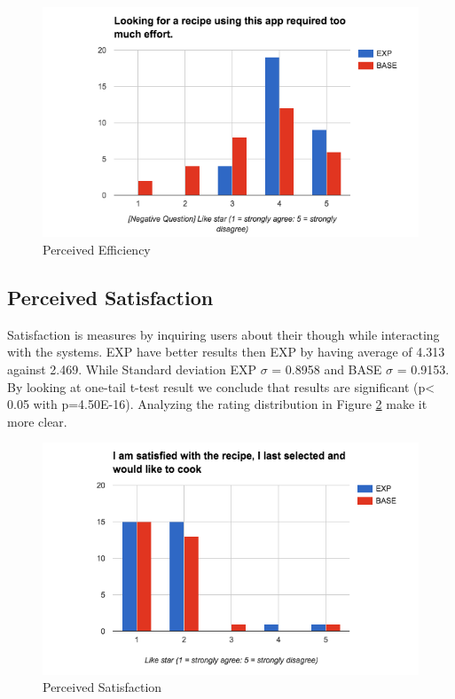 \begin{figure}[h]
	\centering
	\includegraphics[width= 1\linewidth]{figures/ch5_stat_effiiciency}
	\caption{Perceived Efficiency}
	\label{fig:ch5_stat_effiiciency}
\end{figure}

\newpage
\subsection{Perceived Satisfaction}

Satisfaction is measures by inquiring users about their though while interacting with the systems. EXP have better results then EXP by having average of 4.313 against 2.469. While  Standard deviation EXP ${\sigma}$ = 0.8958 and BASE ${\sigma}$ = 0.9153. By looking at one-tail t-test result we conclude that results are significant (p< 0.05 with p=4.50E-16). Analyzing the rating distribution in Figure \ref{fig:ch5_stat_satisfaction} make it more clear. 

\begin{figure}[h]
	\centering
	\includegraphics[width= 1\linewidth]{figures/ch5_stat_satisfaction}
	\caption{Perceived Satisfaction}
	\label{fig:ch5_stat_satisfaction}
\end{figure}


